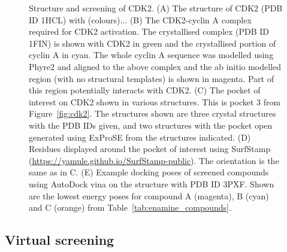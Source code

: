 \begin{figure}
\centering


\caption{Structure and screening of CDK2.
(A) The structure of CDK2 (PDB ID 1HCL) with (colours)...
(B) The CDK2-cyclin A complex required for CDK2 activation.
The crystallised complex (PDB ID 1FIN) is shown with CDK2 in green and the crystallised portion of cyclin A in cyan.
The whole cyclin A sequence was modelled using Phyre2 \cite{Kelley2015} and aligned to the above complex and the ab initio modelled region (with no structural templates) is shown in magenta.
Part of this region potentially interacts with CDK2.
(C) The pocket of interest on CDK2 shown in various structures.
This is pocket 3 from Figure~\ref{fig:cdk2}.
The structures shown are three crystal structures with the PDB IDs given, and two structures with the pocket open generated using ExProSE from the structures indicated.
(D) Residues displayed around the pocket of interest using SurfStamp (\url{https://yamule.github.io/SurfStamp-public}). %
The orientation is the same as in C.
(E) Example docking poses of screened compounds using AutoDock vina on the structure with PDB ID 3PXF.
Shown are the lowest energy poses for compound A (magenta), B (cyan) and C (orange) from Table~\ref{tab:enamine_compounds}.}

\label{fig:cdk2_structure}
\end{figure}


\subsection{Virtual screening}


